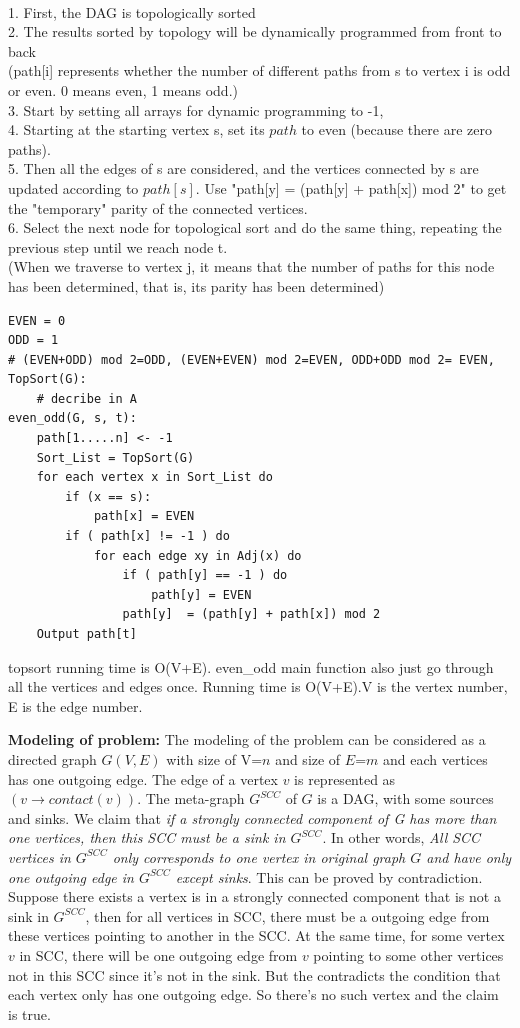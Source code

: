 \documentclass[12pt,a4paper]{article}
\newcommand{\question}[1]{\bigskip\noindent{\textbf{Q{#1} solution}}}
\begin{document}
\question{23.D}\\
1. First, the DAG is topologically sorted
\\2. The results sorted by topology will be dynamically programmed from front to back
\\(path[i] represents whether the number of different paths from s to vertex i is odd or even. 0 means even, 1 means odd.)
\\3. Start by setting all arrays for dynamic programming to -1,
\\4. Starting at the starting vertex s, set its $path$ to even (because there are zero paths).
\\5. Then all the edges of s are considered, and the vertices connected by s are updated according to $path[s]$. Use "path[y] = (path[y] + path[x]) mod 2" to get the "temporary" parity of the connected vertices.
\\6. Select the next node for topological sort and do the same thing, repeating the previous step until we reach node t.
\\(When we traverse to vertex j, it means that the number of paths for this node has been determined, that is, its parity has been determined)
\begin{lstlisting}
EVEN = 0 
ODD = 1
# (EVEN+ODD) mod 2=ODD, (EVEN+EVEN) mod 2=EVEN, ODD+ODD mod 2= EVEN, 
TopSort(G):
	# decribe in A
even_odd(G, s, t):
	path[1.....n] <- -1
	Sort_List = TopSort(G)
	for each vertex x in Sort_List do
		if (x == s):
			path[x] = EVEN
		if ( path[x] != -1 ) do
			for each edge xy in Adj(x) do
				if ( path[y] == -1 ) do
					path[y] = EVEN
				path[y]  = (path[y] + path[x]) mod 2
	Output path[t]
\end{lstlisting}
topsort running time is O(V+E). even\_odd main function also just go through all the vertices and edges once. Running time is O(V+E).V is the vertex number, E is the edge number.\\
\question{24.A}

{\bf Modeling of problem:} The modeling of the problem can be considered as a directed graph $G(V,E)$ with size of V=$n$ and size of $E$=$m$ and each vertices has one outgoing edge. The edge of a vertex $v$ is represented as $(v \rightarrow contact(v))$. The meta-graph $G^{SCC}$ of $G$ is a DAG, with some sources and sinks. We claim that {\em if a strongly connected component of G has more than one vertices, then this SCC must be a sink in $G^{SCC}$}. In other words, {\em All SCC vertices in $G^{SCC}$ only corresponds to one vertex in original graph $G$ and have only one outgoing edge in $G^{SCC}$ except sinks}. This can be proved by contradiction. Suppose there exists a vertex is in a strongly connected component that is not a sink in $G^{SCC}$, then for all vertices in SCC, there must be a outgoing edge from these vertices pointing to another in the SCC. At the same time, for some vertex $v$ in SCC, there will be one outgoing edge from $v$ pointing to some other vertices not in this SCC since it's not in the sink. But the contradicts the condition that each vertex only has one outgoing edge. So there's no such vertex and the claim is true.
\end{document}

